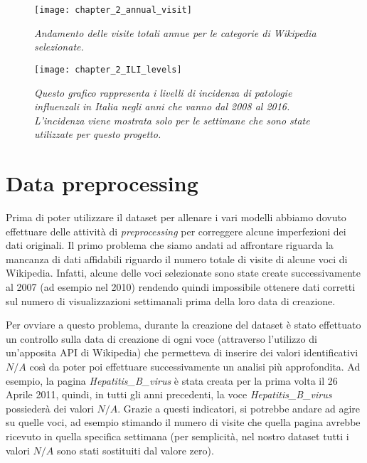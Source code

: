 \begin{figure}[h]

\texttt{[image: chapter\_2\_annual\_visit]}
\caption{\textit{Andamento delle visite totali annue per le categorie di Wikipedia selezionate.}}
\label{fig:ch_2_annual_visit}

\vspace{10px}

\texttt{[image: chapter\_2\_ILI\_levels]}
\caption{\textit{Questo grafico rappresenta i livelli di incidenza di patologie influenzali in Italia negli anni che vanno dal 2008 al 2016. L'incidenza viene mostrata solo per le settimane che sono state utilizzate per questo progetto.}}
\label{fig:ch_2_ILI_levels}

\centering

\end{figure}
\bigskip

\section{Data preprocessing}
\bigskip

Prima di poter utilizzare il dataset per allenare i vari modelli abbiamo dovuto effettuare delle attività di 
\textit{preprocessing} per correggere alcune imperfezioni dei dati originali. Il primo problema che siamo andati ad 
affrontare riguarda la mancanza di dati affidabili riguardo il numero totale di visite di alcune voci di Wikipedia.
Infatti, alcune delle voci selezionate sono state create successivamente al 2007 (ad esempio nel 2010) rendendo quindi 
impossibile ottenere dati corretti sul numero di visualizzazioni settimanali prima della loro data di creazione. 
\bigskip

Per ovviare a questo problema, durante la creazione del dataset è stato effettuato un controllo sulla data di creazione di 
ogni voce (attraverso l'utilizzo di un'apposita API di Wikipedia) che permetteva di inserire dei valori identificativi $N/A
$ così da poter poi effettuare successivamente un analisi più approfondita. Ad esempio, la pagina \textit{Hepatitis_B_virus} 
è stata creata per la prima volta il 26 Aprile 2011, quindi, in tutti gli anni precedenti, la voce \textit{Hepatitis_B_virus} 
possiederà dei valori $N/A$. Grazie a questi indicatori, si potrebbe andare ad agire su quelle voci, ad esempio stimando il 
numero di visite che quella pagina avrebbe ricevuto in quella specifica settimana (per semplicità, nel nostro dataset tutti i 
valori $N/A$ sono stati sostituiti dal valore zero).
\bigskip

